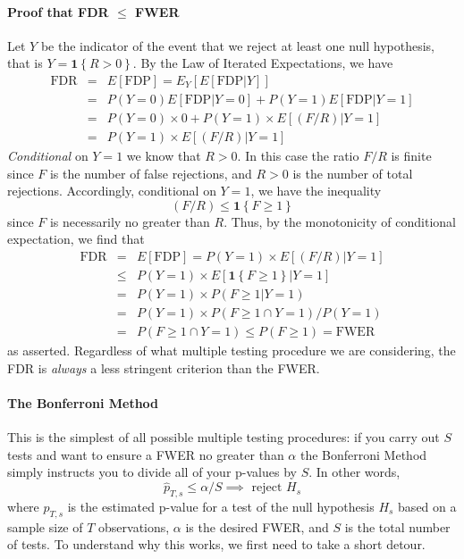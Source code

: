 \paragraph{Proof that FDR $\leq$ FWER}
Let $Y$ be the indicator of the event that we reject at least one null hypothesis, that is $Y = \mathbf{1}\left\{R > 0 \right\}$.
By the Law of Iterated Expectations, we have
\begin{eqnarray*}
  \mbox{FDR} &=& E\left[ \mbox{FDP} \right] = E_Y\left[ E\left[ \mbox{FDP}|Y \right] \right]\\
  &=& P\left( Y=0 \right) E\left[ \mbox{FDP}|Y=0 \right] + P\left( Y=1 \right) E\left[ \mbox{FDP}|Y=1 \right]\\
  &=& P(Y=0) \times 0 + P(Y=1) \times E\left[\left( F/R \right) \left| Y=1 \right. \right]\\
  &=&  P(Y=1)\times E\left[\left( F/R \right) \left| Y=1 \right. \right]
\end{eqnarray*}
\emph{Conditional} on $Y=1$ we know that $R>0$.
In this case the ratio $F/R$ is finite since $F$ is the number of false rejections, and $R>0$ is the number of total rejections.
Accordingly, conditional on $Y=1$, we have the inequality
\begin{equation*}
  \left( F/R \right) \leq \mathbf{1}\left\{ F \geq 1 \right\}
\end{equation*}
since $F$ is necessarily no greater than $R$.
Thus, by the monotonicity of conditional expectation, we find that
\begin{eqnarray*}
  \mbox{FDR} &=& E\left[ \mbox{FDP} \right] = P(Y=1)\times E\left[\left( F/R \right) \left| Y=1 \right. \right]\\
  &\leq& P(Y=1) \times E\left[ \mathbf{1}\left\{ F \geq 1 \right\}| Y=1 \right] \\
  &=& P(Y=1) \times P\left( F\geq 1 | Y=1 \right)\\
  &=& P(Y=1) \times P\left( F\geq 1 \cap Y =1 \right) / P(Y=1)\\
  &=& P(F\geq 1 \cap Y=1) \leq P(F \geq 1) = \mbox{FWER}
\end{eqnarray*}
as asserted. 
Regardless of what multiple testing procedure we are considering, the FDR is \emph{always} a less stringent criterion than the FWER.


\paragraph{The Bonferroni Method}
This is the simplest of all possible multiple testing procedures: if you carry out $S$ tests and want to ensure a FWER no greater than $\alpha$ the Bonferroni Method simply instructs you to divide all of your p-values by $S$.
In other words, 
\begin{equation*}
  \widehat{p}_{T,s} \leq \alpha/S \implies \mbox{ reject } H_s
\end{equation*}
where $\widehat{p}_{T,s}$ is the estimated p-value for a test of the null hypothesis $H_s$ based on a sample size of $T$ observations, $\alpha$ is the desired FWER, and $S$ is the total number of tests.
To understand why this works, we first need to take a short detour.

